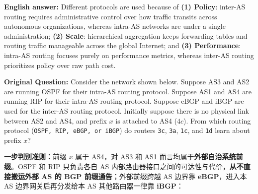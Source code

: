 \textbf{English answer:} Different protocols are used because of \textbf{(1) Policy}: inter-AS routing requires administrative control over how traffic transits across autonomous organizations, whereas intra-AS networks are under a single administration; \textbf{(2) Scale}: hierarchical aggregation keeps forwarding tables and routing traffic manageable across the global Internet; and \textbf{(3) Performance}: intra-AS routing focuses purely on performance metrics, whereas inter-AS routing prioritizes policy over raw path cost.



\textbf{Original Question:} Consider the network shown below. Suppose AS3 and AS2 are running OSPF for their intra-AS routing protocol. Suppose AS1 and AS4 are running RIP for their intra-AS routing protocol. Suppose eBGP and iBGP are used for the inter-AS routing protocol. Initially suppose there is no physical link between AS2 and AS4, and prefix $x$ is attached to AS4 ($4c$). From which routing protocol (\texttt{OSPF, RIP, eBGP, or iBGP}) do routers \texttt{3c}, \texttt{3a}, \texttt{1c}, and \texttt{1d} learn about prefix $x$?


\textbf{一步判别准则：}前缀 $x$ 属于 AS4，对 AS3 和 AS1 而言均属于\textbf{外部自治系统前缀}。OSPF 和 RIP 只负责各自 AS 内部路由器接口之间的可达性与代价，\textbf{从不直接搬运外部 AS 的 BGP 前缀通告}；外部前缀跨越 AS 边界靠 \textbf{eBGP}，进入本 AS 边界网关后再分发给本 AS 其他路由器一律靠 \textbf{iBGP}：

